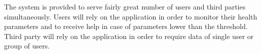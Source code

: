 The system is provided to serve fairly great number of users and third parties simultaneously.
Users will rely on the application in order to monitor their health parameters and to receive help in case of parameters lower than the threshold. Third party will rely on the application in order to require data of single user or group of users.